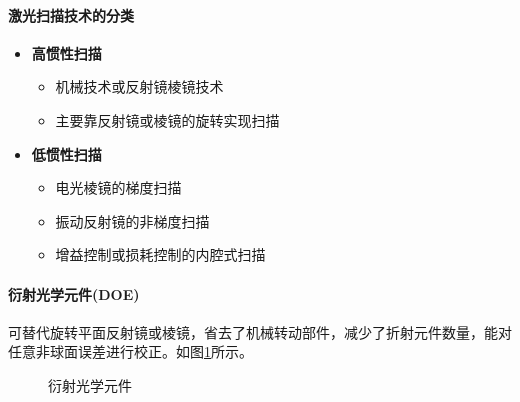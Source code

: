 \paragraph{激光扫描技术的分类}
\begin{itemize}
	\item \textbf{高惯性扫描}
		\begin{itemize}
			\item 机械技术或反射镜棱镜技术
			\item 主要靠反射镜或棱镜的旋转实现扫描
		\end{itemize} %
	\item \textbf{低惯性扫描}
		\begin{itemize}
			\item 电光棱镜的梯度扫描
			\item 振动反射镜的非梯度扫描
			\item 增益控制或损耗控制的内腔式扫描
		\end{itemize}
\end{itemize} %

\paragraph{衍射光学元件(DOE)}可替代旋转平面反射镜或棱镜，省去了机械转动部件，减少了折射元件数量，能对任意非球面误差进行校正。如图\ref{fig:衍射光学元件}所示。
\begin{figure}
	\centering
	\quad
	\caption{衍射光学元件}
	\label{fig:衍射光学元件}
\end{figure}

